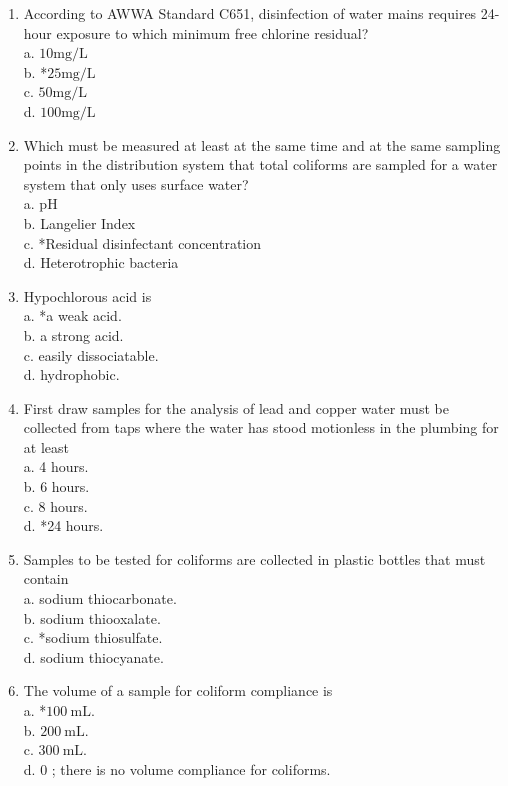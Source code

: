 \documentclass[10pt]{article}
\begin{document}
\begin{enumerate}
  \item According to AWWA Standard C651, disinfection of water mains requires 24-hour exposure to which minimum free chlorine residual?\\
a. $10 \mathrm{mg} / \mathrm{L}$\\
b. *$25 \mathrm{mg} / \mathrm{L}$\\
c. $50 \mathrm{mg} / \mathrm{L}$\\
d. $100 \mathrm{mg} / \mathrm{L}$

  \item Which must be measured at least at the same time and at the same sampling points in the distribution system that total coliforms are sampled for a water system that only uses surface water?\\
a. $\mathrm{pH}$\\
b. Langelier Index\\
c. *Residual disinfectant concentration\\
d. Heterotrophic bacteria 

\item Hypochlorous acid is\\
a. *a weak acid.\\
b. a strong acid.\\
c. easily dissociatable.\\
d. hydrophobic.

  \item First draw samples for the analysis of lead and copper water must be collected from taps where the water has stood motionless in the plumbing for at least\\
a. 4 hours.\\
b. 6 hours.\\
c. 8 hours.\\
d. *24 hours.

  \item Samples to be tested for coliforms are collected in plastic bottles that must contain\\
a. sodium thiocarbonate.\\
b. sodium thiooxalate.\\
c. *sodium thiosulfate.\\
d. sodium thiocyanate.

  \item The volume of a sample for coliform compliance is\\
a. *$100 \mathrm{~mL}$.\\
b. $200 \mathrm{~mL}$.\\
c. $300 \mathrm{~mL}$.\\
d. 0 ; there is no volume compliance for coliforms.


\end{enumerate}
\end{document}
